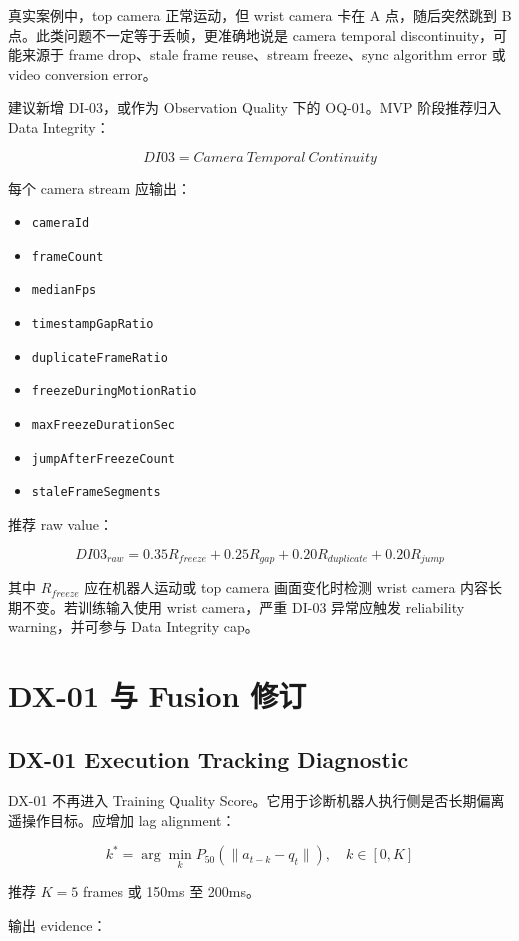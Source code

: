 \documentclass[UTF8,zihao=-4,oneside,openany]{ctexrep}
\newcommand{\Code}[1]{\texttt{#1}}
\begin{document}
真实案例中，top camera 正常运动，但 wrist camera 卡在 A 点，随后突然跳到 B 点。此类问题不一定等于丢帧，更准确地说是 camera temporal discontinuity，可能来源于 frame drop、stale frame reuse、stream freeze、sync algorithm error 或 video conversion error。

建议新增 DI-03，或作为 Observation Quality 下的 OQ-01。MVP 阶段推荐归入 Data Integrity：

\[
DI03=Camera\ Temporal\ Continuity
\]

每个 camera stream 应输出：

\begin{itemize}
\item \Code{cameraId}
\item \Code{frameCount}
\item \Code{medianFps}
\item \Code{timestampGapRatio}
\item \Code{duplicateFrameRatio}
\item \Code{freezeDuringMotionRatio}
\item \Code{maxFreezeDurationSec}
\item \Code{jumpAfterFreezeCount}
\item \Code{staleFrameSegments}
\end{itemize}

推荐 raw value：

\[
DI03_{raw}=0.35R_{freeze}+0.25R_{gap}+0.20R_{duplicate}+0.20R_{jump}
\]

其中 \(R_{freeze}\) 应在机器人运动或 top camera 画面变化时检测 wrist camera 内容长期不变。若训练输入使用 wrist camera，严重 DI-03 异常应触发 reliability warning，并可参与 Data Integrity cap。

\section{DX-01 与 Fusion 修订}

\subsection{DX-01 Execution Tracking Diagnostic}

DX-01 不再进入 Training Quality Score。它用于诊断机器人执行侧是否长期偏离遥操作目标。应增加 lag alignment：

\[
k^*=\arg\min_k P_{50}(\|a_{t-k}-q_t\|),\quad k\in[0,K]
\]

推荐 \(K=5\) frames 或 150ms 至 200ms。

输出 evidence：
\end{document}
